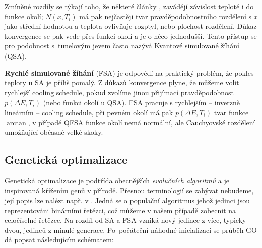 Zmíněné rozdíly se týkají toho, že některé články \cite{SA survey},\cite{VFSA} zavádějí závislost teplotě i do funkce okolí; $N(x,T_i)$ má pak nejčastěji tvar pravděpodobnostního rozdělení s $x$ jako střední hodnotou a teplota ovlivňuje rozptyl, nebo plochost rozdělení. Důkaz konvergence se pak vede přes funkci okolí a je o něco jednodušší. Tento přístup se pro podobnost s~tunelovým jevem často nazývá Kvantové simulované žíhání (QSA).

\textbf{Rychlé simulované žíhání} (FSA) \cite{VFSA} je odpovědí na praktický problém, že pokles teploty u SA je příliš pomalý. Z důkazů konvergence plyne, že můžeme volit rychlejší cooling schedule, pokud zvolíme jinou přijímací pravděpodobnost $p(\Delta E,T_i)$ (nebo funkci okolí u QSA). FSA pracuje s rychlejším -- inverzně lineárním -- cooling schedule, při pevném okolí má pak $p(\Delta E,T_i)$ tvar funkce $\arctan$, v případě QFSA funkce okolí nemá normální, ale Cauchyovské rozdělení umožňující občasné velké skoky.


\subsection{Genetická optimalizace}

Genetická optimalizace je podtřída obecnějších \emph{evolučních algoritmů} a je inspirovaná křížením genů v přírodě. Přesnou terminologií se zabývat nebudeme, její popis lze nalézt např. v \cite[p.~141]{GO ebook}. Jedná se o populační algoritmus jehož jedinci jsou reprezentováni binárními řetězci, což můžeme v našem případě zobecnit na celočíselné řetězce. Na rozdíl od SA a FSA vzniká nový jedinec z více, typicky dvou, jedinců z minulé generace. Po~počáteční náhodné inicializaci se průběh GO dá popsat následujícím schématem:

